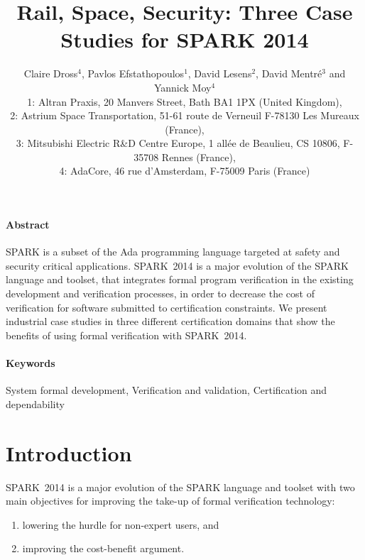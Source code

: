 \documentclass[10pt,a4paper,twocolumn]{article}
\newcommand{\newspark}{SPARK~2014\xspace}
\begin{document}
\title{Rail, Space, Security: Three Case Studies for SPARK 2014}

\author{%
\large Claire Dross$^4$, Pavlos Efstathopoulos$^1$, David Lesens$^2$, David Mentré$^3$ and Yannick Moy$^4$\\
\normalsize 1: Altran Praxis, 20 Manvers Street, Bath BA1 1PX (United Kingdom),\\
\normalsize 2: Astrium Space Transportation, 51-61 route de Verneuil F-78130 Les Mureaux (France),\\
\normalsize 3: Mitsubishi Electric R\&D Centre Europe, 1 allée de
Beaulieu, CS 10806, F-35708 Rennes (France),\\
\normalsize 4: AdaCore, 46 rue d'Amsterdam, F-75009 Paris (France)}

\date{}

\maketitle

\paragraph{Abstract}
SPARK is a subset of the Ada programming language targeted at safety and
security critical applications. \newspark is a major evolution of the SPARK
language and toolset, that integrates formal program verification in the
existing development and verification processes, in order to decrease the cost
of verification for software submitted to certification constraints. We present
industrial case studies in three different certification domains that show the
benefits of using formal verification with \newspark.

\paragraph{Keywords}
System formal development, Verification and validation,
Certification and dependability

\section{Introduction}

\newspark is a major evolution of the SPARK language and toolset with two main objectives for improving the take-up of formal verification technology:
%
\begin{enumerate}
\item lowering the hurdle for non-expert users, and
\item improving the cost-benefit argument.
\end{enumerate}
\end{document}
